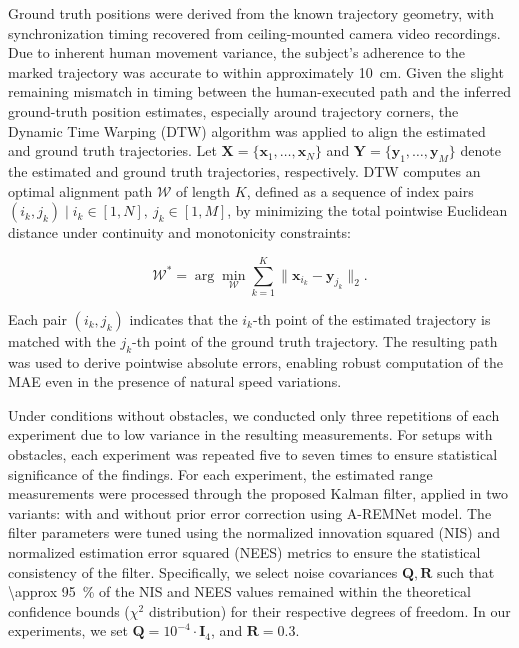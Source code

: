 Ground truth positions were derived from the known trajectory geometry, with synchronization timing recovered from ceiling-mounted camera video recordings. Due to inherent human movement variance, the subject's adherence to the marked trajectory was accurate to within approximately \SI{10}{\centi\meter}. Given the slight remaining mismatch in timing between the human-executed path and the inferred ground-truth position estimates, especially around trajectory corners, the Dynamic Time Warping (DTW) algorithm was applied to align the estimated and ground truth trajectories. Let $\mathbf{X} = \{ \mathbf{x}_1, \dots, \mathbf{x}_N \}$ and $\mathbf{Y} = \{ \mathbf{y}_1, \dots, \mathbf{y}_M \}$ denote the estimated and ground truth trajectories, respectively. DTW computes an optimal alignment path $\mathcal{W}$ of length $K$, defined as a sequence of index pairs $(i_k, j_k) \mid i_k \in [1, N],\ j_k \in [1, M]$, by minimizing the total pointwise Euclidean distance under continuity and monotonicity constraints:

\begin{equation}
\mathcal{W}^* = \arg \min_{\mathcal{W}} \sum_{k=1}^{K} \| \mathbf{x}_{i_k} - \mathbf{y}_{j_k} \|_2.
\end{equation}


Each pair $(i_k, j_k)$ indicates that the $i_k$-th point of the estimated trajectory is matched with the $j_k$-th point of the ground truth trajectory. The resulting path was used to derive pointwise absolute errors, enabling robust computation of the MAE even in the presence of natural speed variations.

Under conditions without obstacles, we conducted only three repetitions of each experiment due to low variance in the resulting measurements. For setups with obstacles, each experiment was repeated five to seven times to ensure statistical significance of the findings. For each experiment, the estimated range measurements were processed through the proposed Kalman filter, applied in two variants: with and without prior error correction using A-REMNet model. The filter parameters were tuned using the normalized innovation squared (NIS) and normalized estimation error squared (NEES) metrics to ensure the statistical consistency of the filter. Specifically, we select noise covariances $\mathbf{Q}, \mathbf{R}$ such that \SI{\approx 95}{\percent} of the NIS and NEES values remained within the theoretical confidence bounds ($\chi^2$ distribution) for their respective degrees of freedom. In our experiments, we set $\mathbf{Q} = 10^{-4} \cdot \mathbf{I}_4$, and $\mathbf{R} = 0.3$.


